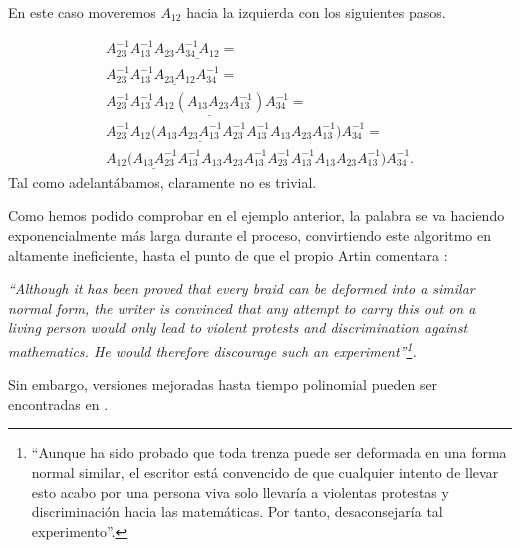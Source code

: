 \documentclass[TFG.tex]{subfiles}
\begin{document}
\begin{ej}
En este caso moveremos $A_{12}$ hacia la izquierda con los siguientes pasos.


\begin{gather*}
A_{23}^{-1}A_{13}^{-1}A_{23}\underline{A_{34}^{-1}A_{12}}=\\
A_{23}^{-1}A_{13}^{-1}\underline{A_{23}A_{12}}A_{34}^{-1}=\\
A_{23}^{-1}A_{13}^{-1}\underline{A_{12}(A_{13}A_{23}A_{13}^{-1})}A_{34}^{-1}=\\
A_{23}^{-1}\underline{A_{12}(A_{13}A_{23}A_{13}^{-1}A_{23}^{-1}A_{13}^{-1}}A_{13}A_{23}A_{13}^{-1})A_{34}^{-1}=\\
\underline{A_{12}(A_{13}A_{23}^{-1}A_{13}^{-1}}A_{13}A_{23}A_{13}^{-1}A_{23}^{-1}A_{13}^{-1}A_{13}A_{23}A_{13}^{-1})A_{34}^{-1}.
\end{gather*}
Tal como adelantábamos, claramente no es trivial.
\end{ej}

Como hemos podido comprobar en el ejemplo anterior, la palabra se va haciendo exponencialmente más larga durante el proceso, convirtiendo este algoritmo en altamente ineficiente, hasta el punto de que el propio Artin comentara \cite{Artin}:

\emph{``Although it has been proved that every braid can be deformed into a similar normal form, the writer is
convinced that any attempt to carry this out on a living person would only lead to violent protests and
discrimination against mathematics. He would therefore discourage such an experiment''\footnote{``Aunque ha sido probado que toda trenza puede ser deformada en una forma normal similar, el escritor está convencido de que cualquier intento de llevar esto acabo por una persona viva solo llevaría a violentas protestas y discriminación hacia las matemáticas. Por tanto, desaconsejaría tal experimento''.}.}

Sin embargo, versiones mejoradas hasta tiempo polinomial pueden ser encontradas en \cite{polynomial}.




\end{document}
